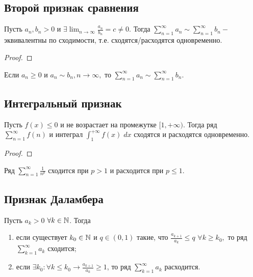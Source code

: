 	\subsection{Второй признак сравнения}
	
	\begin{theorem}
		Пусть $a_n, b_n > 0$ и $\displaystyle \exists \lim_{n \to \infty} {\frac{a_n}{b_n}} = c \neq 0$. Тогда $\displaystyle \sum_{n = 1}^{\infty} a_n \sim \sum_{n = 1}^{\infty} b_n -$ эквивалентны по сходимости, т.е. сходятся/расходятся одновременно.
	\end{theorem}
	
	\begin{proof}
	\end{proof}
	
	\begin{corollary}
		Если $a_n \geqslant 0$ и $a_n \sim b_n, n \rightarrow \infty, $ то $\displaystyle \sum_{n = 1}^{\infty} a_n \sim \sum_{n = 1}^{\infty} b_n$.
	\end{corollary}
	
	\subsection{Интегральный признак}
	
	\begin{sentence}
		Пусть $f(x) \leqslant 0$ и не возрастает на промежутке $[1, +\infty)$. Тогда ряд $\displaystyle \sum_{n = 1}^{\infty} f(n)$ и интеграл $\displaystyle \int_1^{+\infty} f(x) \; dx$ сходятся и расходятся одновременно. 
	\end{sentence}
	
	\begin{proof}
	\end{proof}
	
	\begin{example}
		Ряд $\displaystyle \sum_{n = 1}^{\infty} \frac{1}{n^p}$ сходится при $p > 1$ и расходится при $p \leqslant 1$.
	\end{example}
	
	\subsection{Признак Даламбера}
	
	\begin{theorem}
		Пусть $a_k > 0$ $\forall k \in \mathbb N$. Тогда
		\begin{enumerate}
			\item если существует $k_0 \in \mathbb N$ и $q \in (0, 1)$ такие, что $\frac{a_{k + 1}}{a_k} \leqslant q$ $\forall k \geqslant k_0,$ то ряд $\displaystyle \sum_{k = 1}^{\infty} a_k$ сходится;
			\item если $\exists k_0 : \forall k \leqslant k_0 \rightarrow \frac{a_{k + 1}}{a_k} \geqslant 1$, то ряд $\displaystyle \sum_{k = 1}^{\infty} a_k$ расходится.
		\end{enumerate}
	\end{theorem}
	
